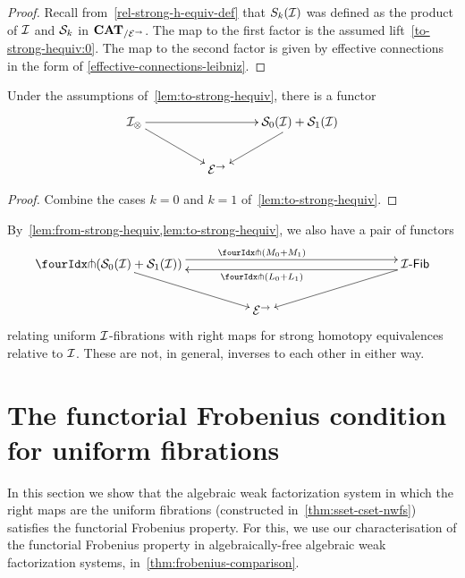 \documentclass[reqno,10pt,a4paper,oneside,draft]{amsart}
\begin{document}
\begin{proof}
Recall from~\eqref{rel-strong-h-equiv-def} that $S_k(\cal{I})$ was defined as the product of $\cal{I}$ and $\cal{S}_k$ in $\CAT_{/\cal{E}^\to}$.
The map to the first factor is the assumed lift~\eqref{to-strong-hequiv:0}.
The map to the second factor is given by effective connections in the form of \cref{effective-connections-leibniz}.
\end{proof}

\begin{proposition} \label{thm:twodir}
Under the assumptions of~\cref{lem:to-strong-hequiv}, there is a functor
\[
\xymatrix@!C@C-2.5em{
    \cal{I}_\otimes
  \ar[dr]
  \ar[rr]
&&
\cal{S}_0(\cal{I}) + \cal{S}_1(\cal{I})
  \ar[dl]
\\&
  \catE^\to
}
\]
\end{proposition}

\begin{proof} Combine the cases $k = 0$ and $k = 1$ of~\cref{lem:to-strong-hequiv}.
\end{proof}

\begin{remark} \label{relating-strong-hequiv-and-uniform-fib}
By~\cref{lem:from-strong-hequiv,lem:to-strong-hequiv}, we also have a pair of functors
\[
\xymatrix@!C@C-2.5em{
  \liftr{(\cal{S}_0(\cal{I}) + \cal{S}_1(\cal{I}))}
  \ar[dr]
  \ar@<4pt>[rr]^{\liftr{(M_0 + M_1)}}
&&
  \Fib{\cal{I}}
  \ar[dl]
  \ar@<4pt>[ll]^{\liftr{(L_0 + L_1)}}
\\&
  \catE^\to
}
\]
relating uniform $\cal{I}$-fibrations with right maps for strong homotopy equivalences relative to $\cal{I}$.
These are not, in general, inverses to each other in either way.
\end{remark}

\section{The functorial Frobenius condition for uniform fibrations}
\label{sec:frocuf}

In this section we show that the algebraic weak factorization system in which the right maps are the uniform fibrations (constructed in~\cref{thm:sset-cset-nwfs}) satisfies the functorial Frobenius property.
For this, we use our characterisation of the functorial Frobenius property in algebraically-free algebraic weak factorization systems, in~\cref{thm:frobenius-comparison}.
\end{document}

